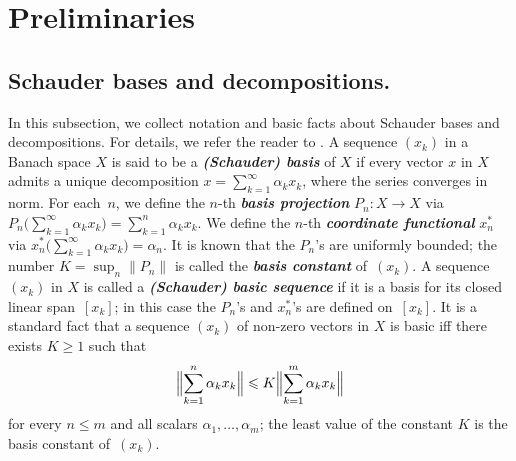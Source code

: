 \documentclass[12pt]{amsart}
\theoremstyle{plain}
\theoremstyle{definition}
\newcommand{\norm}[1]{\lVert#1\rVert}
\newcommand{\Bignorm}[1]{\Bigl\lVert#1\Bigr\rVert}
\newcommand{\term}[1]{{\textit{\textbf{#1}}}}   %
\newcommand{\s}{\sum_{k=1}^\infty}
\renewcommand{\le}{\leqslant}
\renewcommand{\ge}{\geqslant}
\begin{document}
\maketitle

\section{Preliminaries}

\subsection*{Schauder bases and decompositions.}
In this subsection, we collect notation and basic facts about Schauder
bases and decompositions. For details, we refer the reader to
\cite{Lindenstrauss:77,Singer:70,Singer:81}.  A sequence $(x_k)$ in a
Banach space $X$ is said to be a \term{(Schauder) basis} of $X$ if
every vector $x$ in $X$ admits a unique decomposition
$x=\s\alpha_k x_k$, where the series converges in norm. For each~$n$,
we define the $n$-th \term{basis projection} $P_n\colon X\to X$ via
\begin{math}
  P_n\bigl(\s\alpha_k x_k)=\sum_{k=1}^n\alpha_k x_k.
\end{math}
We define the $n$-th \term{coordinate functional} $x_n^*$ via
\begin{math}
  x^*_n\bigl(\s\alpha_k x_k)=\alpha_n.
\end{math}
It is known that the $P_n$'s are uniformly bounded; the number
$K=\sup_n\norm{P_n}$ is called the \term{basis constant} of~$(x_k)$. A
sequence $(x_k)$ in $X$ is called a \term{(Schauder) basic sequence}
if it is a basis for its closed linear span~$[x_k]$; in this case the
$P_n$'s and $x_n^*$'s are defined on~$[x_k]$. It is a standard fact
that a sequence $(x_k)$ of non-zero vectors in $X$ is basic iff there
exists $K\ge 1$ such that
\begin{equation}\label{basis-constant}
  \Bignorm{\sum_{k=1}^n\alpha_kx_k}\le K\Bignorm{\sum_{k=1}^m\alpha_kx_k}
\end{equation}
for every $n\le m$ and all scalars $\alpha_1,\dots,\alpha_m$; the least
value of the constant $K$ is the basis constant of~$(x_k)$.
\end{document}
